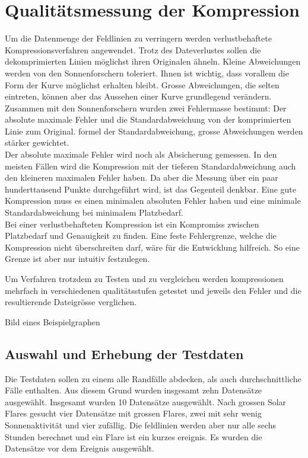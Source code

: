 \section{Qualitätsmessung der Kompression}
Um die Datenmenge der Feldlinien zu verringern werden verlustbehaftete Kompressionsverfahren angewendet. Trotz des Dateverlustes sollen die dekomprimierten Linien möglichst ihren Originalen ähneln. Kleine Abweichungen werden von den Sonnenforschern toleriert. Ihnen ist wichtig, dass vorallem die Form der Kurve möglichst erhalten bleibt. Grosse Abweichungen, die selten eintreten, können aber das Aussehen einer Kurve grundlegend verändern.\\[\baselineskip]
Zusammen mit den Sonnenforschern wurden zwei Fehlermasse bestimmt: Der absolute maximale Fehler und die Standardabweichung von der komprimierten Linie zum Original. 
formel der Standardabweichung, grosse Abweichungen werden stärker gewichtet.\\
Der absolute maximale Fehler wird noch als Absicherung gemessen. In den meisten Fällen wird die Kompression mit der tieferen Standardabweichung auch den kleineren maximalen Fehler haben. Da aber die Messung über ein paar hunderttausend Punkte durchgeführt wird, ist das Gegenteil denkbar. Eine gute Kompression muss es einen minimalen absoluten Fehler haben und eine minimale Standardabweichung bei minimalem Platzbedarf.\\[\baselineskip]
Bei einer verlustbehafteten Kompression ist ein Kompromiss zwischen Platzbedarf und Genauigkeit zu finden. Eine feste Fehlergrenze, welche die Kompression nicht überschreiten darf, wäre für die Entwicklung hilfreich. So eine Grenze ist aber nur intuitiv festzulegen.

Um Verfahren trotzdem zu Testen und zu vergleichen werden kompressionen mehrfach in verschiedenen qualitätsstufen getestet und jeweils den Fehler und die resultierende Dateigrösse verglichen.

Bild eines Beispielgraphen

\subsection{Auswahl und Erhebung der Testdaten}
Die Testdaten sollen zu einem alle Randfälle abdecken, als auch durchschnittliche Fälle enthalten. Aus diesem Grund wurden insgesamt zehn Datensätze ausgewählt. 
Insgesamt wurden 10 Datensätze ausgewählt. Nach grossen Solar Flares gesucht vier Datensätze mit grossen Flares, zwei mit sehr wenig Sonnenaktivität und vier zufällig.
Die feldlinien werden aber nur alle sechs Stunden berechnet und ein Flare ist ein kurzes ereignis. Es wurden die Datensätze vor dem Ereignis ausgewählt.

